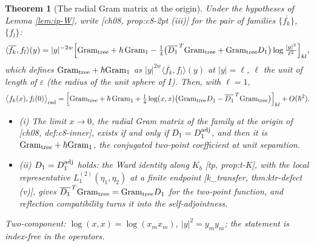 \documentclass[11pt]{report}
\theoremstyle{plain}
\newtheorem{theorem}{Theorem}[chapter]
\theoremstyle{definition}
\numberwithin{equation}{chapter}
\newcommand{\Gt}{\mathrm{Gram}_{\rm tree}}
\newcommand{\Go}{\mathrm{Gram}_{1}}
\newcommand{\rad}{{\rm rad}}
\begin{document}
\begin{theorem}[The radial Gram matrix at the origin]
\label{thm:ip-origin}
Under the hypotheses of Lemma \ref{lem:ip-W}, write [ch08, prop:c8-2pt (iii)] for the pair of families $\{\overline{f_k}\}$, $\{f_l\}$:
\begin{equation}
\langle\overline{f_k},f_l\rangle(y)=|y|^{-2w}\Big[\Gt+\hbar\,\Go-\tfrac14\big(\overline{D_1}^{\,T}\Gt+\Gt D_1\big)\log\tfrac{|y|^2}{\ell^2}\Big]_{kl},
\label{eq:ip-H}
\end{equation}
which defines $\Gt+\hbar\Go$ as $|y|^{2w}\langle\overline{f_k},f_l\rangle(y)$ at $|y|=\ell$, $\ell$ the unit of length of $\varepsilon$ (the radius of the unit sphere of $I$). Then, with $\ell=1$,
\begin{equation}
\big\langle f_k(x),f_l(0)\big\rangle_\rad=\Big[\Gt+\hbar\,\Go+\tfrac14\log(x,x)\big(\Gt D_1-\overline{D_1}^{\,T}\Gt\big)\Big]_{kl}+O(\hbar^2).
\label{eq:ip-origin}
\end{equation}
\begin{itemize}
\item (i) The limit $x\to0$, the radial Gram matrix of the family at the origin of [ch08, def:c8-inner], exists if and only if $D_1=D_1^{\rm adj}$, and then it is $\Gt+\hbar\Go$, the conjugated two-point coefficient at unit separation.
\item (ii) $D_1=D_1^{\rm adj}$ holds: the Ward identity along $K_b$ [tp, prop:t-K], with the local representative $L_1^{(2)}(\eta_1,\eta_2)$ at a finite endpoint [k\_transfer, thm:ktr-defect (v)], gives $\overline{D_1}^{\,T}\Gt=\Gt D_1$ for the two-point function, and reflection compatibility turns it into the self-adjointness.
\end{itemize}
Two-component: $\log(x,x)=\log(x_mx_m)$, $|y|^2=y_my_m$; the statement is index-free in the operators.
\end{theorem}
\end{document}

